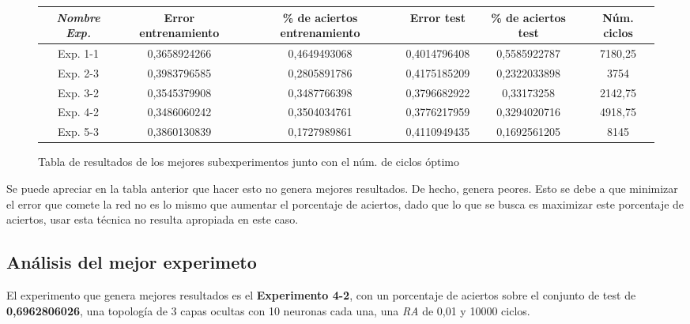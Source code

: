\documentclass{uc3mpracticas}
\begin{document}
\begin{figure}[!h]
\begin{center}
  \begin{adjustwidth}{-1.4cm}{}
    \begin{tabular}{|c|c|c|c|c|c|}
      \hline
      \rowcolor{LightCyan}
          \textit{\textbf{Nombre Exp.}}     & \textbf{Error entrenamiento} & \textbf{\% de aciertos entrenamiento} & \textbf{Error test} & \textbf{\% de aciertos test} & \textbf{Núm. ciclos} \\ \hline
          Exp. 1-1         &  0,3658924266       &  0,4649493068                &  0,4014796408   &  0,5585922787   &  7180,25  \\ \hline
          Exp. 2-3         &  0,3983796585       &  0,2805891786                &  0,4175185209   &  0,2322033898   &  3754     \\ \hline
          Exp. 3-2         &  0,3545379908       &  0,3487766398                &  0,3796682922   &  0,33173258     &  2142,75  \\ \hline
          Exp. 4-2         &  0,3486060242       &  0,3504034761                &  0,3776217959   &  0,3294020716   &  4918,75  \\ \hline
          Exp. 5-3         &  0,3860130839       &  0,1727989861                &  0,4110949435   &  0,1692561205   &  8145     \\ \hline
    \end{tabular}
  \end{adjustwidth}
\end{center}
\caption*{Tabla de resultados de los mejores subexperimentos junto con el núm. de ciclos óptimo}
\end{figure}

Se puede apreciar en la tabla anterior que hacer esto no genera mejores resultados. De hecho, genera peores. Esto se debe a que minimizar el error que comete la red no es lo mismo que aumentar el porcentaje de aciertos, dado que lo que se busca es maximizar este porcentaje de aciertos, usar esta técnica no resulta apropiada en este caso.



\subsection{Análisis del mejor experimeto}

El experimento que genera mejores resultados es el \textbf{Experimento 4-2}, con un porcentaje de aciertos sobre el conjunto de test de \textbf{0,6962806026}, una topología de 3 capas ocultas con 10 neuronas cada una, una \textit{RA} de 0,01 y 10000 ciclos.
\end{document}

